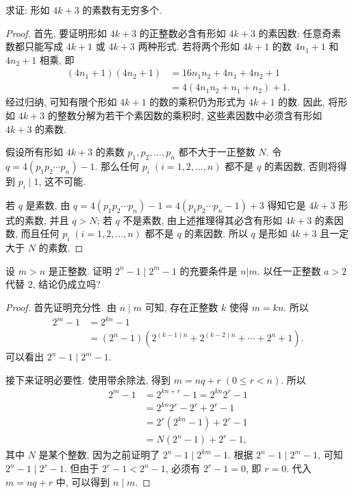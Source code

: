 \documentclass[a5paper,fleqn,10pt]{article}
\begin{document}
\begin{exmp}
    求证: 形如 $4k+3$ 的素数有无穷多个.
    \begin{proof}
        首先, 要证明形如 $4k+3$ 的正整数必含有形如 $4k+3$ 的素因数: 任意奇素数都只能写成 $4k+1$ 或 $4k+3$ 两种形式. 若将两个形如 $4k+1$ 的数 $4n_1+1$ 和 $4n_2+1$ 相乘, 即
        \begin{align*}
            (4n_1+1)(4n_2+1) & =16n_1n_2+4n_1+4n_2+1  \\
                             & =4(4n_1n_2+n_1+n_2)+1.
        \end{align*}
        经过归纳, 可知有限个形如 $4k+1$ 的数的乘积仍为形式为 $4k+1$ 的数. 因此, 将形如 $4k+3$ 的整数分解为若干个素因数的乘积时, 这些素因数中必须含有形如 $4k+3$ 的素数.

        假设所有形如 $4k+3$ 的素数 $p_1,p_2,\ldots,p_n$ 都不大于一正整数 $N$. 令 $q=4(p_1p_2\cdots p_n)-1$. 那么任何 $p_i\;(i=1,2,\ldots,n)$ 都不是
        $q$ 的素因数, 否则将得到 $p_i\mid1$, 这不可能.

        若 $q$ 是素数, 由 $q=4(p_1p_2\cdots p_n)-1=4(p_1p_2\cdots p_n-1)+3$ 得知它是 $4k+3$ 形式的素数, 并且 $q>N$; 若 $q$ 不是素数, 由上述推理得其必含有形如 $4k+3$
        的素因数, 而且任何 $p_i\;(i=1,2,\ldots,n)$ 都不是 $q$ 的素因数. 所以 $q$ 是形如 $4k+3$ 且一定大于 $N$ 的素数.
    \end{proof}
\end{exmp}

\begin{exmp}
    设 $m>n$ 是正整数. 证明 $2^n-1\mid 2^m-1$ 的充要条件是 $n|m$. 以任一正整数 $a>2$ 代替 $2$, 结论仍成立吗?
    \begin{proof}
        首先证明充分性. 由 $n\mid m$ 可知, 存在正整数 $k$ 使得 $m=kn$. 所以
        \begin{align*}
            2^m-1&=2^{kn}-1\\
            &=(2^n-1)(2^{(k-1)n}+2^{(k-2)n}+\cdots+2^n+1).
        \end{align*}
        可以看出 $2^n-1\mid 2^m-1$.

        接下来证明必要性. 使用带余除法, 得到 $m=nq+r\;(0\leq r<n)$. 所以
        \begin{align*}
            2^m-1&=2^{kn+r}-1=2^{kn}2^r-1\\
            &=2^{kn}2^r-2^r+2^r-1\\
            &=2^r(2^{kn}-1)+2^r-1\\
            &=N(2^n-1)+2^r-1,
        \end{align*}
        其中 $N$ 是某个整数, 因为之前证明了 $2^n-1\mid 2^{km}-1$. 根据 $2^n-1\mid 2^m-1$,
        可知 $2^n-1\mid 2^r-1$. 但由于 $2^r-1<2^n-1$, 必须有 $2^r-1=0$, 即 $r=0$. 代入 $m=nq+r$
        中, 可以得到 $n\mid m$.
    \end{proof}
\end{exmp}
\end{document}
